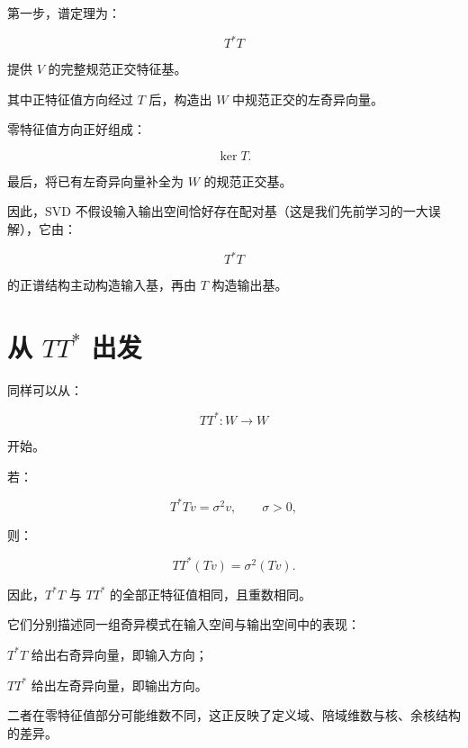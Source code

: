 第一步，谱定理为：

\[
T^*T
\]

提供 $V$ 的完整规范正交特征基。

其中正特征值方向经过 $T$ 后，构造出 $W$ 中规范正交的左奇异向量。

零特征值方向正好组成：

\[
\ker T.
\]

最后，将已有左奇异向量补全为 $W$ 的规范正交基。

因此，SVD 不假设输入输出空间恰好存在配对基（这是我们先前学习的一大误解），它由：

\[
T^*T
\]

的正谱结构主动构造输入基，再由 $T$ 构造输出基。

\section[从 TT* 出发]{从 $TT^*$ 出发}

同样可以从：

\[
TT^*:W\to W
\]

开始。

若：

\[
T^*Tv=\sigma^2v,
\qquad
\sigma>0,
\]

则：

\[
TT^*(Tv)
=
\sigma^2(Tv).
\]

因此，$T^*T$ 与 $TT^*$ 的全部正特征值相同，且重数相同。

它们分别描述同一组奇异模式在输入空间与输出空间中的表现：

\begin{jitem}
\item %
$T^*T$ 给出右奇异向量，即输入方向；
\item %
$TT^*$ 给出左奇异向量，即输出方向。
\end{jitem}

二者在零特征值部分可能维数不同，这正反映了定义域、陪域维数与核、余核结构的差异。
